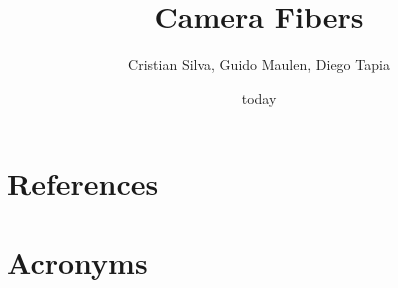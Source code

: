 \documentclass[PMO,authoryear,toc]{lsstdoc}
\title{Camera Fibers}
\author{%
Cristian Silva, Guido Maulen, Diego Tapia
}
\date {today}
\begin{document}
\maketitle




\appendix
\section{References} \label{sec:bib}
\renewcommand{\refname}{} %


\section{Acronyms} \label{sec:acronyms}

\end{document}
